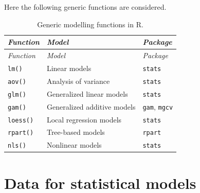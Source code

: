 \documentclass[
]{book}
\begin{document}
Here the following generic functions are considered.

\begin{longtable}[]{@{}
  >{\raggedright\arraybackslash}p{}
  >{\raggedright\arraybackslash}p{}
  >{\raggedright\arraybackslash}p{}@{}}
\caption{\label{tab:ModelFuncs} Generic modelling functions in R.}\tabularnewline
\toprule\noalign{}
\begin{minipage}[b]{\linewidth}\raggedright
\emph{{Function}}
\end{minipage} & \begin{minipage}[b]{\linewidth}\raggedright
\emph{{Model}}
\end{minipage} & \begin{minipage}[b]{\linewidth}\raggedright
\emph{{Package}}
\end{minipage} \\
\midrule\noalign{}
\endfirsthead
\toprule\noalign{}
\begin{minipage}[b]{\linewidth}\raggedright
\emph{{Function}}
\end{minipage} & \begin{minipage}[b]{\linewidth}\raggedright
\emph{{Model}}
\end{minipage} & \begin{minipage}[b]{\linewidth}\raggedright
\emph{{Package}}
\end{minipage} \\
\midrule\noalign{}
\endhead
\bottomrule\noalign{}
\endlastfoot
\texttt{lm()} & Linear models & \texttt{stats} \\
\texttt{aov()} & Analysis of variance & \texttt{stats} \\
\texttt{glm()} & Generalized linear models & \texttt{stats} \\
\texttt{gam()} & Generalized additive models & \texttt{gam}, \texttt{mgcv} \\
\texttt{loess()} & Local regression models & \texttt{stats} \\
\texttt{rpart()} & Tree-based models & \texttt{rpart} \\
\texttt{nls()} & Nonlinear models & \texttt{stats} \\
\end{longtable}

\section{Data for statistical models}\label{data-for-statistical-models}
\end{document}
